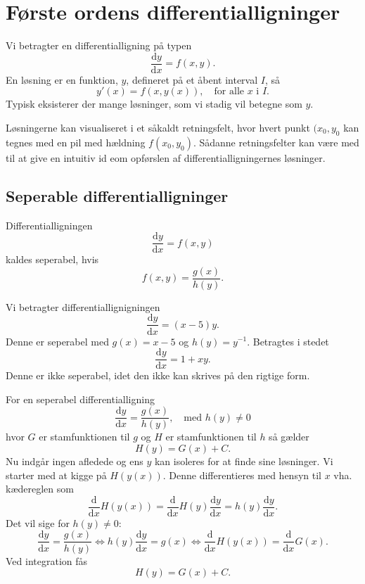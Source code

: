 
\section{Første ordens differentialligninger}
Vi betragter en differentialligning på typen
\[ 
\frac{\mathrm{d}y}{\mathrm{d}x} = f(x,y)
.\]
En løsning er en funktion, $y$, defineret på et åbent interval $I$, så
\[ 
y'(x) = f(x, y(x)), \quad \text{for alle } x \text{ i } I
.\]
Typisk eksisterer der mange løsninger, som vi stadig vil betegne som $y$.

Løsningerne kan visualiseret i et såkaldt retningsfelt, hvor hvert punkt $(x_0, y_0$ kan tegnes med en pil med hældning $f(x_0, y_0)$. Sådanne retningsfelter kan være med til at give en intuitiv id eom opførslen af differentialligningernes løsninger.

\subsection{Seperable differentialligninger}
Differentialligningen
\[ 
\frac{\mathrm{d}y}{\mathrm{d}x} = f(x,y)
\]
kaldes seperabel, hvis
\[ 
f(x,y) = \frac{g(x)}{h(y)}
.\]

\begin{eks} 
  Vi betragter differentiallignigningen
  \[ 
  \frac{\mathrm{d}y}{\mathrm{d}x} = (x-5)y
  .\]
  Denne er seperabel med $g(x) = x-5$ og $h(y) = y^{-1}$.
  \bigbreak
  Betragtes i stedet
  \[ 
  \frac{\mathrm{d}y}{\mathrm{d}x} = 1+xy
  .\]
  Denne er ikke seperabel, idet den ikke kan skrives på den rigtige form.
\end{eks}

\begin{sæt} 
  For en seperabel differentialligning
  \[ 
  \frac{\mathrm{d}y}{\mathrm{d}x} = \frac{g(x)}{h(y)}, \quad \text{med } h(y) \neq 0
  \]
  hvor $G$ er stamfunktionen til $g$ og $H$ er stamfunktionen til $h$ så gælder
  \[ 
  H(y) = G(x) + C
  .\]
  Nu indgår ingen afledede og ens $y$ kan isoleres for at finde sine løsninger.
  \tcblower
  Vi starter med at kigge på $H(y(x))$. Denne differentieres med hensyn til $x$ vha. kædereglen som
  \[ 
  \frac{\mathrm{d}}{\mathrm{d}x} H(y(x)) = \frac{\mathrm{d}}{\mathrm{d}x} H(y) \frac{\mathrm{d}y}{\mathrm{d}x} = h(y) \frac{\mathrm{d}y}{\mathrm{d}x} 
  .\]
  Det vil sige for $h(y) \neq 0$:
  \[ 
  \frac{\mathrm{d}y}{\mathrm{d}x} = \frac{g(x)}{h(y)} \iff h(y) \frac{\mathrm{d}y}{\mathrm{d}x} = g(x) \iff \frac{\mathrm{d}}{\mathrm{d}x} H(y(x)) = \frac{\mathrm{d}}{\mathrm{d}x} G(x)
  .\]
  Ved integration fås
  \[ 
  H(y) = G(x) + C
  .\]
\end{sæt}


